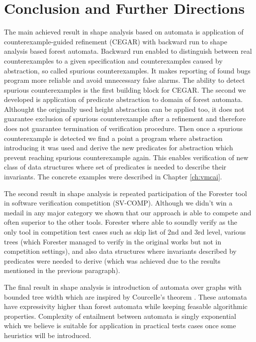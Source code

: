 {\chapter{Conclusion and Further Directions}
\label{ch:concl}
The main achieved result in shape analysis based on automata is
application of counterexample-guided refinement (CEGAR) with backward run to shape
analysis based forest automata.
Backward run enabled to distinguish between real counterexamples to a given
specification and counterexamples caused by abstraction, so called spurious
counterexamples.
It makes reporting of found bugs program more reliable and avoid unnecessary
false alarms.
The ability to detect spurious counterexamples is the first building block
for CEGAR.
The second we developed is application of predicate abstraction to domain of forest automata.
Althought the originally used height abstraction can be applied too, it does not guarantee
exclusion of spurious counterexample after a refinement and therefore does not guarantee
termination of verification procedure.
Then once a spurious counterexample is detected we find a point a program where abstraction
introducing it was used and derive the new predicates for abstraction which prevent
reaching spurious counterexample again.
This enables verification of new class of data structures where set of predicates
is needed to describe their invariants.
The concrete examples were described in Chapter \ref{ch:vmcai}.

The second result in shape analysis is repeated participation of the Forester
tool in software verification competition (SV-COMP).
Although we didn't win a medail in any major category we shown that our approach
is able to compete and often superior to the other tools.
Forester where able to soundly verify as the only tool in competition test cases
such as skip list of 2nd and 3rd level, various trees (which Forester managed to
verify in the original works \cite{boxes13} but not in competition settings),
and also data structures where invariants described by predicates were needed to derive
(which was achieved due to the results mentioned in the previous paragraph).

The final result in shape analysis is introduction of automata over graphs
with bounded tree width which are inspired by Courcelle's theorem \cite{courcell_graph_2012}.
These automata have expressivity higher than forest automata while keeping
feasable algorithmic properties.
Complexity of entailment between automata is singly exponential which we believe
is suitable for application in practical tests cases once some heuristics will be introduced.

}
